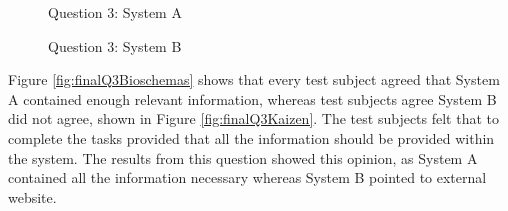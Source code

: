 \begin{figure}[!h]
  \centering
  \begin{minipage}[b]{0.47\textwidth}
    \caption{Question 3: System A}
    \label{fig:finalQ4Bioschemas}
  \end{minipage}
  \hfill
  \begin{minipage}[b]{0.47\textwidth}
    \caption{Question 3: System B}
    \label{fig:finalQ4Kaizen}
  \end{minipage}
\end{figure}

Figure \ref{fig:finalQ3Bioschemas} shows that every test subject agreed that System A contained enough relevant information, whereas test subjects agree System B did not agree, shown in Figure \ref{fig:finalQ3Kaizen}. The test subjects felt that to complete the tasks provided that all the information should be provided within the system. The results from this question showed this opinion, as System A contained all the information necessary whereas System B pointed to external website.

